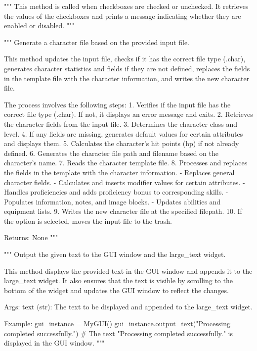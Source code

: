 \begin{codebox}
"""
This method is called when checkboxes are checked or unchecked.
It retrieves the values of the checkboxes and prints a message indicating whether they are enabled or disabled.
"""
\end{codebox}

\begin{codebox}[Creator.generate\_char(self, file=global\_vars.current\_file)]
"""
Generate a character file based on the provided input file.

This method updates the input file, checks if it has the correct file type (.char),
generates character statistics and fields if they are not defined, replaces the fields
in the template file with the character information, and writes the new character file.

The process involves the following steps:
	1. Verifies if the input file has the correct file type (.char). If not, it displays an error message and exits.
	2. Retrieves the character fields from the input file.
	3. Determines the character class and level.
	4. If any fields are missing, generates default values for certain attributes and displays them.
	5. Calculates the character's hit points (hp) if not already defined.
	6. Generates the character file path and filename based on the character's name.
	7. Reads the character template file.
	8. Processes and replaces the fields in the template with the character information.
	   - Replaces general character fields.
	   - Calculates and inserts modifier values for certain attributes.
	   - Handles proficiencies and adds proficiency bonus to corresponding skills.
	   - Populates information, notes, and image blocks.
	   - Updates abilities and equipment lists.
	9. Writes the new character file at the specified filepath.
	10. If the option is selected, moves the input file to the trash.

Returns:
    None
"""
\end{codebox}

\begin{codebox}
"""
Output the given text to the GUI window and the large_text widget.

This method displays the provided text in the GUI window and appends it to the large_text widget.
It also ensures that the text is visible by scrolling to the bottom of the widget and updates
the GUI window to reflect the changes.

Args:
    text (str): The text to be displayed and appended to the large_text widget.

Example:
    gui_instance = MyGUI()
    gui_instance.output_text("Processing completed successfully.")
    # The text "Processing completed successfully." is displayed in the GUI window.
"""
\end{codebox}

